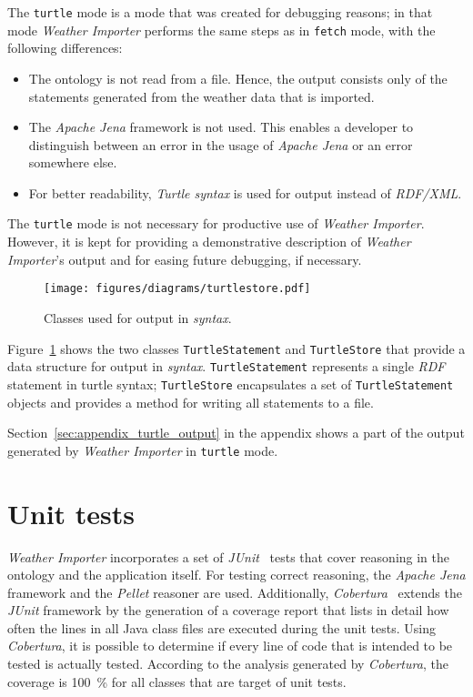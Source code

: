 The \texttt{turtle} mode is a mode that was created for debugging reasons; in that mode \emph{Weather Importer} performs the same steps as in \texttt{fetch} mode, with the following differences:
\begin{itemize}
  \item The \smarthomeweather ontology is not read from a file. Hence, the output consists only of the statements generated from the weather data that is imported.
  \item The \emph{Apache Jena} framework is not used. This enables a developer to distinguish between an error in the usage of \emph{Apache Jena} or an error somewhere else.
  \item For better readability, \emph{\acs{Turtle} syntax} is used for output instead of \emph{RDF/XML}.
\end{itemize}

The \texttt{turtle} mode is not necessary for productive use of \emph{Weather Importer}. However, it is kept for providing a demonstrative description of \emph{Weather Importer}'s output and for easing future debugging, if necessary.

\begin{figure}
\centering
\texttt{[image: figures/diagrams/turtlestore.pdf]}
\caption[Classes used for output in \emph{ syntax}]{Classes used for output in \emph{ syntax}.}
\label{fig:importer_turtlestore}
\end{figure}

Figure~\ref{fig:importer_turtlestore} shows the two classes \texttt{TurtleStatement} and \texttt{TurtleStore} that provide a data structure for output in \emph{ syntax}. \texttt{TurtleStatement} represents a single \emph{RDF} statement in turtle syntax; \texttt{TurtleStore} encapsulates a set of \texttt{TurtleStatement} objects and provides a method for writing all statements to a file.

Section~\ref{sec:appendix_turtle_output} in the appendix shows a part of the output generated by \emph{Weather Importer} in \texttt{turtle} mode.

\section{Unit tests}
\label{sec:importer_tests}

\emph{Weather Importer} incorporates a set of \emph{JUnit}~\cite{junit} tests that cover reasoning in the \smarthomeweather ontology and the application itself. For testing correct reasoning, the \emph{Apache Jena} framework and the \emph{Pellet} reasoner are used. Additionally, \emph{Cobertura}~\cite{cobertura} extends the \emph{JUnit} framework by the generation of a coverage report that lists in detail how often the lines in all Java class files are executed during the unit tests. Using \emph{Cobertura}, it is possible to determine if every line of code that is intended to be tested is actually tested. According to the analysis generated by \emph{Cobertura}, the coverage is \num{100}~\% for all classes that are target of unit tests.

